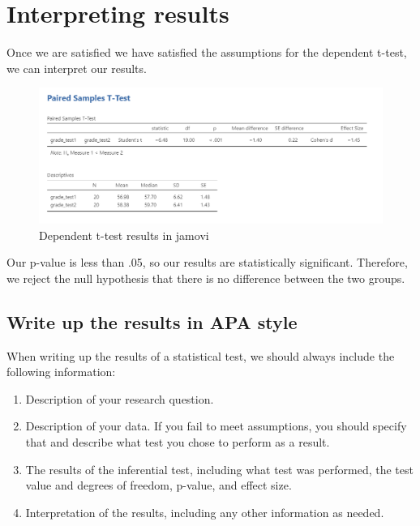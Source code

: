 \documentclass[
]{book}
\providecommand{\tightlist}{%
  \setlength{\itemsep}{0pt}\setlength{\parskip}{0pt}}
\begin{document}
\hypertarget{interpreting-results}{%
\section{Interpreting results}\label{interpreting-results}}

Once we are satisfied we have satisfied the assumptions for the dependent t-test, we can interpret our results.

\begin{figure}

{\centering \includegraphics[width=1\linewidth]{images/03_dependent_t-test/dependent_results} 

}

\caption{Dependent t-test results in jamovi}\label{fig:unnamed-chunk-7}
\end{figure}

Our p-value is less than .05, so our results are statistically significant. Therefore, we reject the null hypothesis that there is no difference between the two groups.

\hypertarget{write-up-the-results-in-apa-style-1}{%
\subsection{Write up the results in APA style}\label{write-up-the-results-in-apa-style-1}}

When writing up the results of a statistical test, we should always include the following information:

\begin{enumerate}
\def\labelenumi{\arabic{enumi}.}
\tightlist
\item
  Description of your research question.
\item
  Description of your data. If you fail to meet assumptions, you should specify that and describe what test you chose to perform as a result.
\item
  The results of the inferential test, including what test was performed, the test value and degrees of freedom, p-value, and effect size.
\item
  Interpretation of the results, including any other information as needed.
\end{enumerate}
\end{document}
